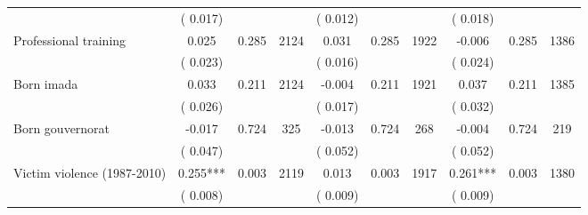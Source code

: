 \begin{tabular}{l*{9}{c}}
                               &        (       0.017) & &                                                                 &       (       0.012) & &                                                          &       (       0.018) & &                                          \\ 
 Professional training                        &              0.025                &        0.285 & 2124                &              0.031 &        0.285 & 1922                       &       -0.006 &        0.285 & 1386                             \\ 
                               &        (       0.023) & &                                                                        &       (       0.016) & &                                                         &       (       0.024) & &                                         \\ 
 Born imada                        &              0.033                &        0.211 & 2124                &             -0.004 &        0.211 & 1921                       &        0.037 &        0.211 & 1385                             \\ 
                               &        (       0.026) & &                                                                        &       (       0.017) & &                                                         &       (       0.032) & &                                         \\ 
 Born gouvernorat                        &             -0.017                &        0.724 & 325                &             -0.013 &        0.724 & 268                       &       -0.004 &        0.724 & 219                             \\ 
                               &        (       0.047) & &                                                                        &       (       0.052) & &                                                         &       (       0.052) & &                                         \\ 
 Victim violence (1987-2010)                        &              0.255***                 &        0.003 & 2119                &              0.013 &        0.003 & 1917                       &        0.261*** &        0.003 & 1380                               \\ 
                               &        (       0.008) & &                                                                        &       (       0.009) & &                                                         &       (       0.009) & &                                         \\ 
\hline \end{tabular}                                                                                                                                                      
